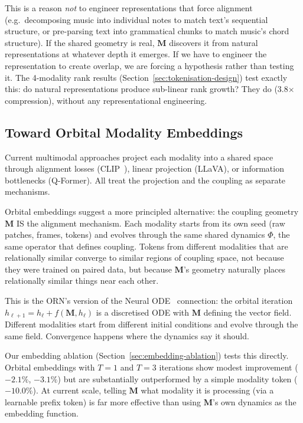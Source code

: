 \documentclass[11pt, a4paper]{article}
\newcommand{\M}{\mathbf{M}}
\theoremstyle{plain}
\theoremstyle{remark}
\begin{document}
This is a reason \emph{not} to engineer representations that force alignment (e.g.\ decomposing music into individual notes to match text's sequential structure, or pre-parsing text into grammatical chunks to match music's chord structure).
If the shared geometry is real, $\M$ discovers it from natural representations at whatever depth it emerges.
If we have to engineer the representation to create overlap, we are forcing a hypothesis rather than testing it.
The 4-modality rank results (Section~\ref{sec:tokenisation-design}) test exactly this: do natural representations produce sub-linear rank growth?
They do (3.8$\times$ compression), without any representational engineering.

\subsection{Toward Orbital Modality Embeddings}

Current multimodal approaches project each modality into a shared space through alignment losses (CLIP~\cite{radford2021clip}), linear projection (LLaVA), or information bottlenecks (Q-Former).
All treat the projection and the coupling as separate mechanisms.

Orbital embeddings suggest a more principled alternative: the coupling geometry $\M$ IS the alignment mechanism.
Each modality starts from its own seed (raw patches, frames, tokens) and evolves through the same shared dynamics $\Phi$, the same operator that defines coupling.
Tokens from different modalities that are relationally similar converge to similar regions of coupling space, not because they were trained on paired data, but because $\M$'s geometry naturally places relationally similar things near each other.

This is the ORN's version of the Neural ODE~\cite{chen2018neural} connection: the orbital iteration $h_{\ell+1} = h_\ell + f(\M, h_\ell)$ is a discretised ODE with $\M$ defining the vector field.
Different modalities start from different initial conditions and evolve through the same field.
Convergence happens where the dynamics say it should.

Our embedding ablation (Section~\ref{sec:embedding-ablation}) tests this directly.  Orbital embeddings with $T{=}1$ and $T{=}3$ iterations show modest improvement ($-2.1\%$, $-3.1\%$) but are substantially outperformed by a simple modality token ($-10.0\%$).  At current scale, telling $\M$ what modality it is processing (via a learnable prefix token) is far more effective than using $\M$'s own dynamics as the embedding function.
\end{document}
